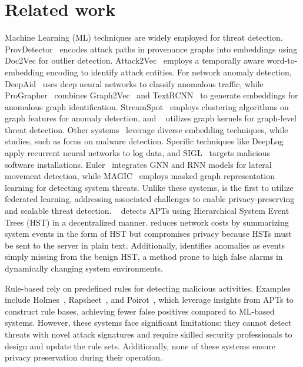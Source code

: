 \section{Related work}
\label{s:relwk}


 Machine Learning (ML) techniques are widely employed for threat detection. ProvDetector~\cite{provdetector2020} encodes attack paths in provenance graphs into embeddings using Doc2Vec\cite{le2014distributed} for outlier detection. Attack2Vec~\cite{shen2019attack2vec} employs a temporally aware word-to-embedding encoding to identify attack entities. For network anomaly detection, DeepAid~\cite{deepaid} uses deep neural networks to classify anomalous traffic, while ProGrapher~\cite{yangprographer} combines Graph2Vec~\cite{narayanan2017graph2vec} and TextRCNN~\cite{lai2015recurrent} to generate embeddings for anomalous graph identification. StreamSpot~\cite{streamspot} employs clustering algorithms on graph features for anomaly detection, and \unicorn~\cite{han2020unicorn} utilizes graph kernels for graph-level threat detection. Other systems~\cite{aljawarneh2018anomaly, maseer2021benchmarking, gyanchandani2012taxonomy, atlas} leverage diverse embedding techniques, while studies, such as\cite{zolkipli2011approach, chakkaravarthy2019survey, isohara2011kernel} focus on malware detection. Specific techniques like DeepLog~\cite{deeplog2017} apply recurrent neural networks to log data, and SIGL~\cite{sigl} targets malicious software installations. Euler~\cite{king2022euler} integrates GNN and RNN models for lateral movement detection, while MAGIC~\cite{jia2023magic} employs masked graph representation learning for detecting system threats. Unlike these systems, \Sys is the first to utilize federated learning, addressing associated challenges to enable privacy-preserving and scalable threat detection. \disdet~\cite{dong2023distdet} detects APTs using Hierarchical System Event Trees (HST) in a decentralized manner. \disdet reduces network costs by summarizing system events in the form of HST but compromises privacy because HSTs must be sent to the server in plain text. Additionally, \disdet identifies anomalies as events simply missing from the benign HST, a method prone to high false alarms in dynamically changing system environments.


 Rule-based \pids rely on predefined rules for detecting malicious activities. Examples include Holmes~\cite{holmes2019}, Rapsheet~\cite{rapsheet2020}, and Poirot~\cite{poirot2019}, which leverage insights from APTs to construct rule bases, achieving fewer false positives compared to ML-based systems. However, these systems face significant limitations: they cannot detect threats with novel attack signatures and require skilled security professionals to design and update the rule sets. Additionally, none of these systems ensure privacy preservation during their operation.

